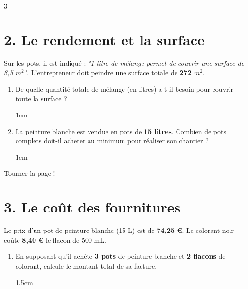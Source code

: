 \documentclass[a4paper]{book}
\begin{document}
{\begin{exerciceNote}{3}
        \section*{2. Le rendement et la surface}
        Sur les pots, il est indiqué : \textit{"1 litre de mélange permet de couvrir une surface de 8,5 $m^2$"}. L'entrepreneur doit peindre une surface totale de \textbf{272 $m^2$}.
        
        \begin{enumerate}[resume, leftmargin=*]
            \item De quelle quantité totale de mélange (en litres) a-t-il besoin pour couvrir toute la surface ?
            
            \begin{ZoneReponse}{1cm}                
            \end{ZoneReponse}
            
            \item La peinture blanche est vendue en pots de \textbf{15 litres}. Combien de pots complets doit-il acheter au minimum pour réaliser son chantier ?

            \begin{ZoneReponse}{1cm}                
            \end{ZoneReponse}
        \end{enumerate}


\vfill
\hfill Tourner la page !

\newpage
        
        \section*{3. Le coût des fournitures}
        Le prix d'un pot de peinture blanche (15 L) est de \textbf{74,25 \euro}. Le colorant noir coûte \textbf{8,40 \euro} le flacon de 500 mL.
        
        \begin{enumerate}[resume, leftmargin=*]
            \item En supposant qu'il achète \textbf{3 pots} de peinture blanche et \textbf{2 flacons} de colorant, calcule le montant total de sa facture.
               
            \begin{ZoneReponse}{1.5cm}                
            \end{ZoneReponse} 
        \end{enumerate}
    \end{exerciceNote} 


}
\end{document}
